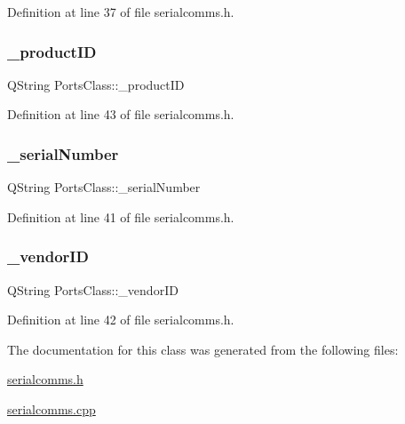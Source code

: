 Definition at line 37 of file serialcomms.\+h.

\mbox{\label{classPortsClass_abee7fa7a0c5b404bb642709d47720b4f}} 
\subsubsection{\texorpdfstring{\_productID}{\_productID}}
{\footnotesize\ttfamily Q\+String Ports\+Class\+::\+\_\+product\+ID\hspace{0.3cm}{\ttfamily [private]}}



Definition at line 43 of file serialcomms.\+h.

\mbox{\label{classPortsClass_a6da92952a206b58a2325cd8d3393c438}} 
\subsubsection{\texorpdfstring{\_serialNumber}{\_serialNumber}}
{\footnotesize\ttfamily Q\+String Ports\+Class\+::\+\_\+serial\+Number\hspace{0.3cm}{\ttfamily [private]}}



Definition at line 41 of file serialcomms.\+h.

\mbox{\label{classPortsClass_ac7fb67486a136f2a0667d2b4b1be403e}} 
\subsubsection{\texorpdfstring{\_vendorID}{\_vendorID}}
{\footnotesize\ttfamily Q\+String Ports\+Class\+::\+\_\+vendor\+ID\hspace{0.3cm}{\ttfamily [private]}}



Definition at line 42 of file serialcomms.\+h.



The documentation for this class was generated from the following files\+:\begin{DoxyCompactItemize}
\item 
\mbox{\hyperlink{serialcomms_8h}{serialcomms.\+h}}\item 
\mbox{\hyperlink{serialcomms_8cpp}{serialcomms.\+cpp}}\end{DoxyCompactItemize}
